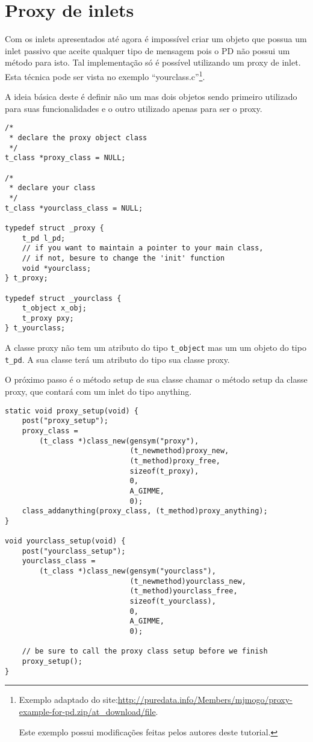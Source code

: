 
\section{Proxy de inlets}
Com os inlets apresentados até agora é impossível criar um objeto que possua
um inlet passivo que aceite qualquer tipo de mensagem pois o PD não possui um
método para isto.
Tal implementação só é possível utilizando um proxy de inlet.
Esta técnica pode ser vista no exemplo ``yourclass.c''\footnote{Exemplo adaptado do
site:\url{http://puredata.info/Members/mjmogo/proxy-example-for-pd.zip/at_download/file}.

Este exemplo possui modificações feitas pelos autores deste tutorial.}.

A ideia básica deste \external é definir não um mas dois objetos sendo primeiro
utilizado para suas funcionalidades e o outro utilizado apenas para ser o
proxy.

\begin{lstlisting}[caption=Estruturas de dados para um proxy]
/*
 * declare the proxy object class
 */
t_class *proxy_class = NULL;

/*
 * declare your class
 */
t_class *yourclass_class = NULL;

typedef struct _proxy {
	t_pd l_pd;
	// if you want to maintain a pointer to your main class,
	// if not, besure to change the 'init' function
	void *yourclass;
} t_proxy;

typedef struct _yourclass {
	t_object x_obj;
	t_proxy pxy;
} t_yourclass;

\end{lstlisting}

A classe proxy não tem um atributo do tipo \texttt{t\_object} mas um um objeto do tipo
\texttt{t\_pd}.
A sua classe terá um atributo do tipo sua classe proxy.

O próximo passo é o método setup de sua classe chamar o método setup da classe
proxy, que contará com um inlet do tipo anything.

\begin{lstlisting}[caption=configuração de um inlet proxy]
static void proxy_setup(void) {
	post("proxy_setup");
	proxy_class =
		(t_class *)class_new(gensym("proxy"),
							 (t_newmethod)proxy_new,
							 (t_method)proxy_free,
							 sizeof(t_proxy),
							 0,
							 A_GIMME,
							 0);
	class_addanything(proxy_class, (t_method)proxy_anything);
}

void yourclass_setup(void) {
	post("yourclass_setup");
	yourclass_class =
		(t_class *)class_new(gensym("yourclass"),
							 (t_newmethod)yourclass_new,
							 (t_method)yourclass_free,
							 sizeof(t_yourclass),
							 0,
							 A_GIMME,
							 0);
	
	// be sure to call the proxy class setup before we finish
	proxy_setup();
}
\end{lstlisting}

